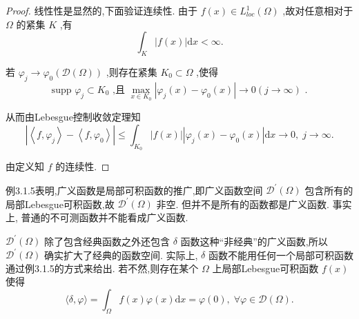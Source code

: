 \documentclass[lang=cn,newtx,10pt,scheme=chinese,thmcnt=chapter]{elegantbook}
\newcommand{\dif}{\mathrm{d}}
\begin{document}
\begin{proof}
   线性性是显然的,下面验证连续性. 由于 \(f\left( x\right)  \in  {L}_{loc}^{1}\left( \Omega \right)\) ,故对任意相对于 \(\Omega\) 的紧集 \(K\) ,有
\begin{equation*}
{\int }_{K}\left| {f\left( x\right) }\right| {\dif x} < \infty .
\end{equation*}

若 \({\varphi }_{j} \rightarrow  {\varphi }_{0}\left( {\mathcal{D}\left( \Omega \right) }\right)\) ,则存在紧集 \({K}_{0} \subset  \Omega\) ,使得
\begin{equation*}
\text{ supp }{\varphi }_{j} \subset  {K}_{0}\text{ ,且 }\mathop{\max }\limits_{{x \in  {K}_{0}}}\left| {{\varphi }_{j}\left( x\right)  - {\varphi }_{0}\left( x\right) }\right|  \rightarrow  0\left( {j \rightarrow  \infty }\right) \text{ . }
\end{equation*}

从而由Lebesgue控制收敛定理知
\begin{equation*}
\left| {\left\langle  {f,{\varphi }_{j}}\right\rangle   - \left\langle  {f,{\varphi }_{0}}\right\rangle  }\right|  \leqslant  {\int }_{{K}_{0}}\left| {f\left( x\right) }\right| \left| {{\varphi }_{j}\left( x\right)  - {\varphi }_{0}\left( x\right) }\right| {\dif x} \rightarrow  0,\;j \rightarrow  \infty .
\end{equation*}

由定义知 \(f\) 的连续性.
\end{proof}
\begin{note}
例3.1.5表明,广义函数是局部可积函数的推广,即广义函数空间 \({\mathcal{D}}^{\prime }\left( \Omega \right)\) 包含所有的局部Lebesgue可积函数,故 \({\mathcal{D}}^{\prime }\left( \Omega \right)\) 非空. 但并不是所有的函数都是广义函数. 事实上, 普通的不可测函数并不能看成广义函数.
\end{note}

 \({\mathcal{D}}^{\prime }\left( \Omega \right)\) 除了包含经典函数之外还包含 \(\delta\) 函数这种“非经典”的广义函数,所以 \({\mathcal{D}}^{\prime }\left( \Omega \right)\) 确实扩大了经典的函数空间. 实际上, \(\delta\) 函数不能用任何一个局部可积函数通过例3.1.5的方式来给出. 若不然,则存在某个 \(\Omega\) 上局部Lebesgue可积函数 \(f\left( x\right)\) 使得
\begin{equation*}
\langle \delta ,\varphi \rangle  = {\int }_{\Omega }f\left( x\right) \varphi \left( x\right) {\dif x} = \varphi \left( 0\right) ,\;\forall \varphi  \in  \mathcal{D}\left( \Omega \right) .
\end{equation*}
\end{document}

